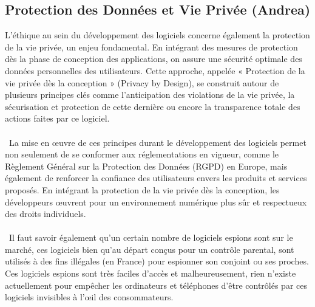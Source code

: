 \documentclass{article}
\begin{document}
\subsection{Protection des Données et Vie Privée (Andrea)}

L’éthique au sein du développement des logiciels concerne également la protection de la vie privée, un enjeu fondamental. En intégrant des mesures de protection dès la phase de conception des applications, on assure une sécurité optimale des données personnelles des utilisateurs. Cette approche, appelée « Protection de la vie privée dès la conception » (Privacy by Design), se construit autour de plusieurs principes clés comme l’anticipation des violations de la vie privée, la sécurisation et protection de cette dernière ou encore la transparence totale des actions faites par ce logiciel.
\\\\
 La mise en œuvre de ces principes durant le développement des logiciels permet non seulement de se conformer aux réglementations en vigueur, comme le Règlement Général sur la Protection des Données (RGPD) en Europe, mais également de renforcer la confiance des utilisateurs envers les produits et services proposés. En intégrant la protection de la vie privée dès la conception, les développeurs œuvrent pour un environnement numérique plus sûr et respectueux des droits individuels.
\\\\
 Il faut savoir également qu’un certain nombre de logiciels espions sont sur le marché, ces logiciels bien qu’au départ conçus pour un contrôle parental, sont utilisés à des fins illégales (en France) pour espionner son conjoint ou ses proches. Ces logiciels espions sont très faciles d’accès et malheureusement, rien n’existe actuellement pour empêcher les ordinateurs et téléphones d’être contrôlés par ces logiciels invisibles à l’œil des consommateurs.
\\\\
\end{document}
